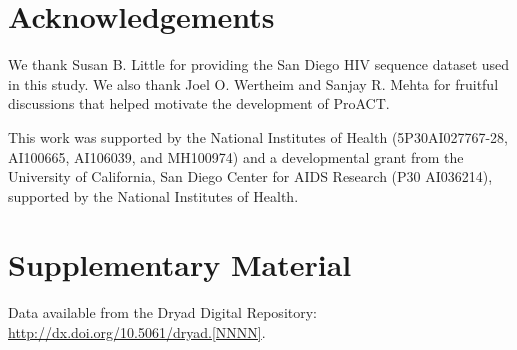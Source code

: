 \documentclass[oupdraft]{sysbio}
\begin{document}


\section{Acknowledgements}
We thank Susan B. Little for providing the San Diego HIV sequence dataset used in this study.
We also thank Joel O. Wertheim and Sanjay R. Mehta for fruitful discussions that helped motivate the development of ProACT.

This work was supported by the National Institutes of Health (5P30AI027767-28, AI100665, AI106039, and MH100974) and a developmental grant from the University of California, San Diego Center for AIDS Research (P30 AI036214), supported by the National Institutes of Health.

\section{Supplementary Material}
Data available from the Dryad Digital Repository:
\url{http://dx.doi.org/10.5061/dryad.[NNNN]}.

\bigskip\bigskip




\end{document}
